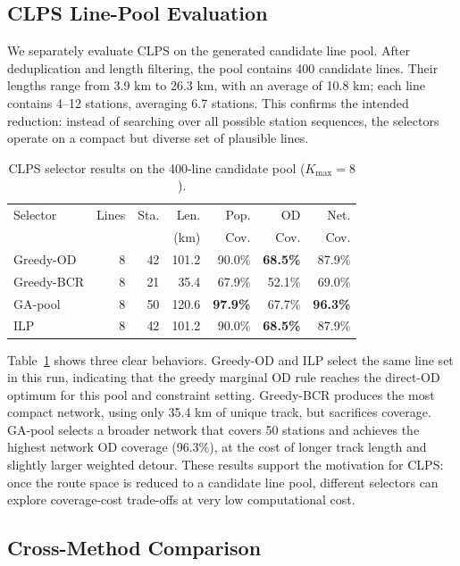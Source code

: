 \documentclass[conference]{IEEEtran}
\begin{document}
\subsection{CLPS Line-Pool Evaluation}

We separately evaluate CLPS on the generated candidate line pool. After
deduplication and length filtering, the pool contains 400 candidate lines.
Their lengths range from 3.9 km to 26.3 km, with an average of 10.8 km;
each line contains 4--12 stations, averaging 6.7 stations. This confirms
the intended reduction: instead of searching over all possible station
sequences, the selectors operate on a compact but diverse set of plausible
lines.

\begin{table}[t]
\centering
\caption{CLPS selector results on the 400-line candidate pool
($K_{\max}=8$).}
\label{tab:clps_results}
\scriptsize
\setlength{\tabcolsep}{2.5pt}
\begin{tabular}{lrrrrrr}
\toprule
Selector & Lines & Sta. & Len. & Pop. & OD & Net. \\
 & & & (km) & Cov. & Cov. & Cov. \\
\midrule
Greedy-OD  & 8 & 42 & 101.2 & 90.0\% & \textbf{68.5\%} & 87.9\% \\
Greedy-BCR & 8 & 21 & 35.4  & 67.9\% & 52.1\% & 69.0\% \\
GA-pool    & 8 & 50 & 120.6 & \textbf{97.9\%} & 67.7\% & \textbf{96.3\%} \\
ILP        & 8 & 42 & 101.2 & 90.0\% & \textbf{68.5\%} & 87.9\% \\
\bottomrule
\end{tabular}
\end{table}

Table~\ref{tab:clps_results} shows three clear behaviors. Greedy-OD and
ILP select the same line set in this run, indicating that the greedy
marginal OD rule reaches the direct-OD optimum for this pool and constraint
setting. Greedy-BCR produces the most compact network, using only 35.4 km
of unique track, but sacrifices coverage. GA-pool selects a broader network
that covers 50 stations and achieves the highest network OD coverage
(96.3\%), at the cost of longer track length and slightly larger weighted
detour. These results support the motivation for CLPS: once the route
space is reduced to a candidate line pool, different selectors can explore
coverage-cost trade-offs at very low computational cost.

\subsection{Cross-Method Comparison}
\end{document}
